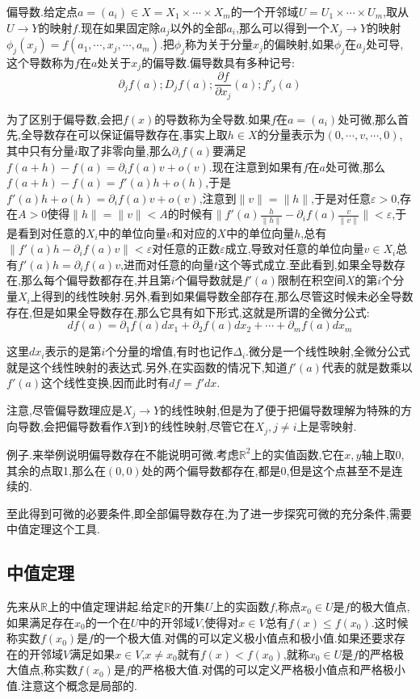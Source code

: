 偏导数.给定点$a=(a_i)\in X=X_1\times\cdots\times X_m$的一个开邻域$U=U_1\times\cdots\times U_m$,取从$U\to Y$的映射$f$.现在如果固定除$a_j$以外的全部$a_i$,那么可以得到一个$X_j\to Y$的映射$\phi_j(x_j)=f(a_1,\cdots,x_j,\cdots,a_m)$.把$\phi_j$称为关于分量$x_j$的偏映射,如果$\phi_j$在$a_j$处可导,这个导数称为$f$在$a$处关于$x_j$的偏导数.偏导数具有多种记号:
$$\partial_jf(a);D_jf(a);\frac{\partial f}{\partial x_j}(a);f'_j(a)$$

为了区别于偏导数,会把$f(x)$的导数称为全导数.如果$f$在$a=(a_i)$处可微,那么首先,全导数存在可以保证偏导数存在,事实上取$h\in X$的分量表示为$(0,\cdots,v,\cdots,0)$,其中只有分量$i$取了非零向量,那么$\partial_if(a)$要满足$f(a+h)-f(a)=\partial_if(a)v+o(v)$.现在注意到如果有$f$在$a$处可微,那么$f(a+h)-f(a)=f'(a)h+o(h)$,于是$f'(a)h+o(h)=\partial_if(a)v+o(v)$,注意到$\|v\|=\|h\|$,于是对任意$\varepsilon>0$,存在$A>0$使得$\|h\|=\|v\|<A$的时候有$\|f'(a)\frac{h}{\|h\|}-\partial_if(a)\frac{v}{\|v\|}\|<\varepsilon$,于是看到对任意的$X_i$中的单位向量$v$和对应的$X$中的单位向量$h$,总有$\|f'(a)h-\partial_if(a)v\|<\varepsilon$对任意的正数$\varepsilon$成立,导致对任意的单位向量$v\in X_i$总有$f'(a)h=\partial_if(a)v$,进而对任意的向量$t$这个等式成立.至此看到,如果全导数存在,那么每个偏导数都存在,并且第$i$个偏导数就是$f'(a)$限制在积空间$X$的第$i$个分量$X_i$上得到的线性映射.另外,看到如果偏导数全部存在,那么尽管这时候未必全导数存在,但是如果全导数存在,那么它具有如下形式,这就是所谓的全微分公式:
$$df(a)=\partial_1f(a)dx_1+\partial_2f(a)dx_2+\cdots+\partial_mf(a)dx_m$$

这里$dx_i$表示的是第$i$个分量的增值,有时也记作$\Delta_i$.微分是一个线性映射,全微分公式就是这个线性映射的表达式.另外,在实函数的情况下,知道$f'(a)$代表的就是数乘以$f'(a)$这个线性变换,因而此时有$df=f'dx$.

注意,尽管偏导数理应是$X_j\to Y$的线性映射,但是为了便于把偏导数理解为特殊的方向导数,会把偏导数看作$X$到$Y$的线性映射,尽管它在$X_j,j\not=i$上是零映射.

例子.来举例说明偏导数存在不能说明可微.考虑$\mathbb{R}^2$上的实值函数,它在$x,y$轴上取0,其余的点取1,那么在$(0,0)$处的两个偏导数都存在,都是0,但是这个点甚至不是连续的.

至此得到可微的必要条件,即全部偏导数存在,为了进一步探究可微的充分条件,需要中值定理这个工具.
\newpage
\subsection{中值定理}

先来从$\mathbb{R}$上的中值定理讲起.给定$\mathbb{R}$的开集$U$上的实函数$f$,称点$x_0\in U$是$f$的极大值点,如果满足存在$x_0$的一个在$U$中的开邻域$V$,使得对$x\in V$总有$f(x)\le f(x_0)$.这时候称实数$f(x_0)$是$f$的一个极大值.对偶的可以定义极小值点和极小值.如果还要求存在的开邻域$V$满足如果$x\in V$,$x\not=x_0$就有$f(x)<f(x_0)$,就称$x_0\in U$是$f$的严格极大值点,称实数$f(x_0)$是$f$的严格极大值.对偶的可以定义严格极小值点和严格极小值.注意这个概念是局部的.

